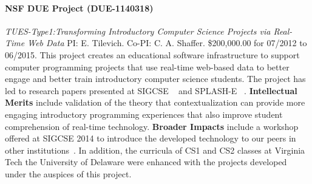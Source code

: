 \documentclass[11pt]{article}
\begin{document}
\paragraph{NSF DUE Project (DUE-1140318)}
\emph{TUES-Type1:Transforming Introductory Computer Science Projects via Real-Time Web Data}
PI: E. Tilevich.
Co-PI: C. A. Shaffer.
\$200,000.00 for 07/2012 to 06/2015.
This project creates an educational software infrastructure to support
computer programming projects that use real-time web-based data to better
engage and better train introductory computer science students.
The project has led to research papers presented at SIGCSE ~\cite{bart-rtw-success} and
SPLASH-E ~\cite{bart-rtw}.
\textbf{Intellectual Merits} include validation of the theory that contextualization can provide more engaging introductory programming experiences that also improve student comprehension of real-time technology. 
\textbf{Broader Impacts} include a workshop offered at SIGCSE 2014 to introduce the
developed technology to our peers in other institutions~\cite{bart-rtw-workshop}. In
addition, the curricula of CS1 and CS2 classes at Virginia Tech the
University of Delaware were enhanced
with the projects developed under the auspices of this project.

%

\newpage
\pagestyle{empty}


\end{document}
